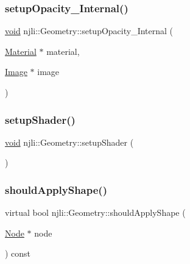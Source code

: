 \subsubsection{\texorpdfstring{setup\+Opacity\+\_\+\+Internal()}{setupOpacity\_Internal()}}
{\footnotesize\ttfamily \mbox{\hyperlink{_thread_8h_af1e856da2e658414cb2456cb6f7ebc66}{void}} njli\+::\+Geometry\+::setup\+Opacity\+\_\+\+Internal (\begin{DoxyParamCaption}\item[{\mbox{\hyperlink{classnjli_1_1_material}{Material}} $\ast$}]{material,  }\item[{\mbox{\hyperlink{classnjli_1_1_image}{Image}} $\ast$}]{image }\end{DoxyParamCaption})\hspace{0.3cm}{\ttfamily [private]}}

\mbox{\label{classnjli_1_1_geometry_ae448a8fa9c7aaccd9db8ed6dfcf62dab}} 
\subsubsection{\texorpdfstring{setup\+Shader()}{setupShader()}}
{\footnotesize\ttfamily \mbox{\hyperlink{_thread_8h_af1e856da2e658414cb2456cb6f7ebc66}{void}} njli\+::\+Geometry\+::setup\+Shader (\begin{DoxyParamCaption}{ }\end{DoxyParamCaption})}

\mbox{\label{classnjli_1_1_geometry_a9d2e2064f925d9be17ed7fb1b84b728a}} 
\subsubsection{\texorpdfstring{should\+Apply\+Shape()}{shouldApplyShape()}}
{\footnotesize\ttfamily virtual bool njli\+::\+Geometry\+::should\+Apply\+Shape (\begin{DoxyParamCaption}\item[{\mbox{\hyperlink{classnjli_1_1_node}{Node}} $\ast$}]{node }\end{DoxyParamCaption}) const\hspace{0.3cm}{\ttfamily [pure virtual]}}



